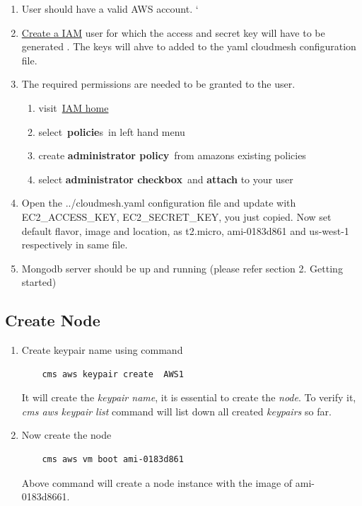 \documentclass[9pt,twocolumn,twoside]{../../styles/osajnl}
\begin{document}
\begin{enumerate}

\item User should have a valid AWS account.  ` \item
  \href{https://console.aws.amazon.com/iam/home?#/users}{Create a IAM}
  \cite{www-aws-iam} user for which the access and secret key will
  have to be generated \cite{www-attach-policy}. The keys will ahve to
  added to the yaml cloudmesh configuration file.
	
\item The required permissions are needed to be granted to the user.
  \begin{enumerate}
			
  \item visit \href{https://console.aws.amazon.com/iam/home} {IAM
      home} \cite{www-aws-iam-home}
  \item select \textbf{policie}s in left hand menu
  \item create \textbf{administrator policy} from amazons existing
    policies
  \item select \textbf{administrator checkbox} and \textbf{attach} to
    your user
  \end{enumerate}
		
\item Open the ../cloudmesh.yaml configuration file and update with
  EC2\_ACCESS\_KEY, EC2\_SECRET\_KEY, you just copied. Now set default
  flavor, image and location, as t2.micro, ami-0183d861 and us-west-1
  respectively in same file.

\item Mongodb server should be up and running (please refer section
  2. Getting started)


\end{enumerate}

\subsection{Create Node}

\begin{enumerate}

\item Create keypair name using command
	
	\begin{verbatim}
	cms aws keypair create  AWS1
	\end{verbatim}
	
  It will create the \textit{keypair name}, it is essential to create
  the \textit{node}. To verify it, \textit{cms aws keypair list}
  command will list down all created \textit{keypairs} so far.
	
\item Now create the node
	
	\begin{verbatim}
	cms aws vm boot ami-0183d861
	\end{verbatim}
	
  Above command will create a node instance with the image of
  ami-0183d8661.

\end{enumerate}	
\end{document}
